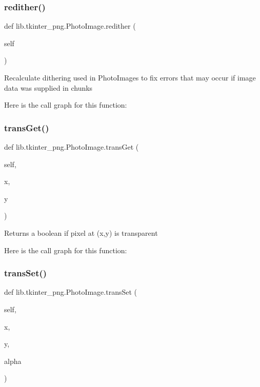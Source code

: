 \subsubsection{\texorpdfstring{redither()}{redither()}}
{\footnotesize\ttfamily def lib.\+tkinter\+\_\+png.\+Photo\+Image.\+redither (\begin{DoxyParamCaption}\item[{}]{self }\end{DoxyParamCaption})}

\begin{DoxyVerb}Recalculate dithering used in PhotoImages to fix errors that may occur if image data was supplied in chunks\end{DoxyVerb}
 Here is the call graph for this function\+:
\mbox{\label{classlib_1_1tkinter__png_1_1_photo_image_a574fff7e67399fbdff7cbfa37f6cd4ca}} 
\subsubsection{\texorpdfstring{trans\+Get()}{transGet()}}
{\footnotesize\ttfamily def lib.\+tkinter\+\_\+png.\+Photo\+Image.\+trans\+Get (\begin{DoxyParamCaption}\item[{}]{self,  }\item[{}]{x,  }\item[{}]{y }\end{DoxyParamCaption})}

\begin{DoxyVerb}Returns a boolean if pixel at (x,y) is transparent\end{DoxyVerb}
 Here is the call graph for this function\+:
\mbox{\label{classlib_1_1tkinter__png_1_1_photo_image_a9ca555414a7d560550434fd1f613922d}} 
\subsubsection{\texorpdfstring{trans\+Set()}{transSet()}}
{\footnotesize\ttfamily def lib.\+tkinter\+\_\+png.\+Photo\+Image.\+trans\+Set (\begin{DoxyParamCaption}\item[{}]{self,  }\item[{}]{x,  }\item[{}]{y,  }\item[{}]{alpha }\end{DoxyParamCaption})}

